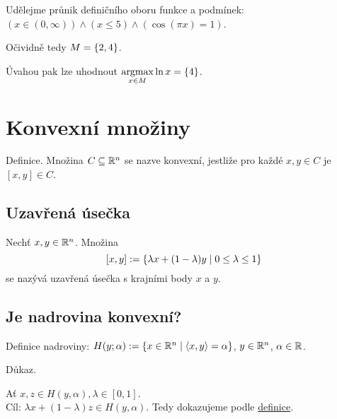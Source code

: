 Udělejme průnik definičního oboru funkce a podmínek: $(x \in (0, \infty)) \land (x \leq 5) \land (\cos(\pi x)=1)$.

\begin{multicols}{2}
\columnbreak

      \quad Očividně tedy $M = \left\lbrace 2,4 \right\rbrace$.

      \quad Úvahou pak lze uhodnout $\underset{x \in M}{\operatorname*{argmax}} \ln x = \left\lbrace 4 \right\rbrace$.
\end{multicols}

\section*{Konvexní množiny} \label{sec:konvex}
Definice. Množina $C \subseteq \mathbb{R}^n$ se nazve konvexní, jestliže pro každé $x, y \in C$ je $[x,y] \in C$.

\subsection{Uzavřená úsečka}
Nechť $x, y \in \mathbb{R}^n$. Množina
\[ [x,y] := \left\lbrace \lambda x + (1-\lambda)y \mid 0 \leq \lambda \leq 1 \right\rbrace \]
se nazývá uzavřená úsečka s krajními body $x$ a $y$.

\subsection{Je nadrovina konvexní?}
Definice nadroviny: $H(y; \alpha) := \left\lbrace x \in \mathbb{R}^n \mid \langle x, y \rangle = \alpha \right\rbrace$, $y \in \mathbb{R}^n$, $\alpha \in \mathbb{R}$.

Důkaz.

Ať $x,z \in H(y, \alpha), \lambda \in [0,1]$.\\
Cíl: $\lambda x + (1-\lambda) z \in H(y, \alpha)$. Tedy dokazujeme podle \hyperref[sec:konvex]{definice}.

